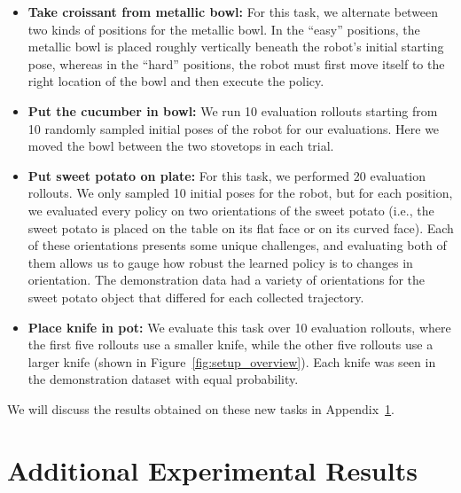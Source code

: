 \documentclass[../thesis.tex]{subfiles}
\begin{document}
\begin{itemize}
    \item \textbf{Take croissant from metallic bowl:} For this task, we alternate between two kinds of positions for the metallic bowl. In the ``easy'' positions, the metallic bowl is placed roughly vertically beneath the robot's initial starting pose, whereas in the ``hard'' positions, the robot must first move itself to the right location of the bowl and then execute the policy.
    \item \textbf{Put the cucumber in bowl:} We run 10 evaluation rollouts starting from 10 randomly sampled initial poses of the robot for our evaluations. Here we moved the bowl between the two stovetops in each trial. 
    \item \textbf{Put sweet potato on plate:} For this task, we performed 20 evaluation rollouts. We only sampled 10 initial poses for the robot, but for each position, we evaluated every policy on two orientations of the sweet potato (i.e., the sweet potato is placed on the table on its flat face or on its curved face). Each of these orientations presents some unique challenges, and evaluating both of them allows us to gauge how robust the learned policy is to changes in orientation. The demonstration data had a variety of orientations for the sweet potato object that differed for each collected trajectory. 
    \item \textbf{Place knife in pot:} We evaluate this task over 10 evaluation rollouts, where the first five rollouts use a smaller knife, while the other five rollouts use a larger knife (shown in Figure~\ref{fig:setup_overview}). Each knife was seen in the demonstration dataset with equal probability.
\end{itemize}

We will discuss the results obtained on these new tasks in Appendix~\ref{app:exp_results}.


\section{Additional Experimental Results}
\label{app:exp_results}
\end{document}

